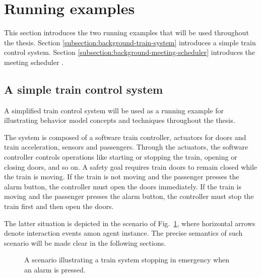\section{Running examples\label{section:background-running-examples}}

This section introduces the two running examples that will be used throughout the thesis. Section \ref{subsection:background-train-system} introduces a simple train control system. Section \ref{subsection:background-meeting-scheduler} introduces the meeting scheduler \cite{Feather:1997}.

\subsection{A simple train control system\label{subsection:background-train-system}}

A simplified train control system will be used as a running example for illustrating behavior model concepts and techniques throughout the thesis. 

The system is composed of a software train controller, actuators for doors and train acceleration, sensors and passengers. Through the actuators, the software controller controls operations like starting or stopping the train, opening or closing doors, and so on. A safety goal requires train doors to remain closed while the train is moving. If the train is not moving and the passenger presses the alarm button, the controller must open the doors immediately. If the train is moving and the passenger presses the alarm button, the controller must stop the train first and then open the doors. 

The latter situation is depicted in the scenario of Fig.~\ref{image:train-scenario-all-agents}, where horizontal arrows denote interaction events amon agent instance. The precise semantics of such scenario will be made clear in the following sections.

\begin{figure}[H]\centering
{}
\caption{A scenario illustrating a train system stopping in emergency when an alarm is pressed.\label{image:train-scenario-all-agents}}
\end{figure}

